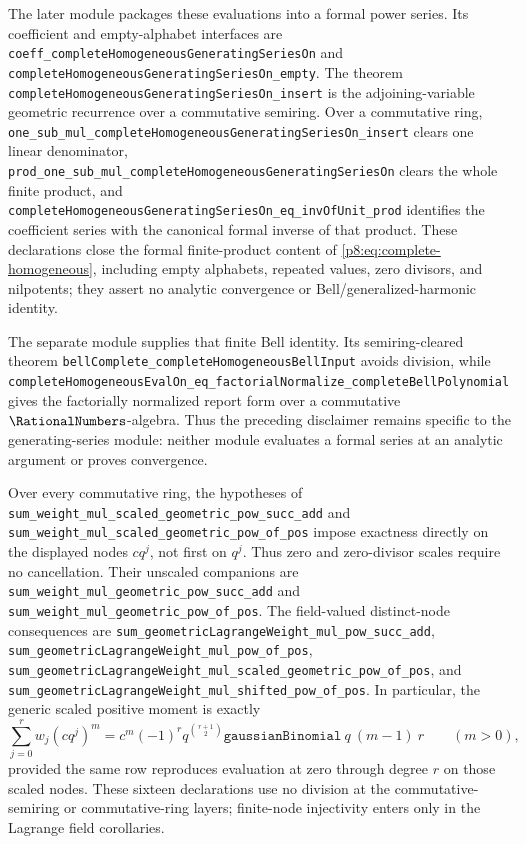 \documentclass[11pt]{article}
\numberwithin{equation}{section}
\theoremstyle{definition}
\theoremstyle{remark}
\begin{document}
The later module  packages these
evaluations into a formal power series.  Its coefficient and empty-alphabet
interfaces are
\nolinkurl{coeff_completeHomogeneousGeneratingSeriesOn} and
\nolinkurl{completeHomogeneousGeneratingSeriesOn_empty}.  The theorem
\nolinkurl{completeHomogeneousGeneratingSeriesOn_insert} is the
adjoining-variable geometric recurrence over a commutative semiring.  Over a
commutative ring,
\nolinkurl{one_sub_mul_completeHomogeneousGeneratingSeriesOn_insert} clears
one linear denominator,
\nolinkurl{prod_one_sub_mul_completeHomogeneousGeneratingSeriesOn} clears the
whole finite product, and
\nolinkurl{completeHomogeneousGeneratingSeriesOn_eq_invOfUnit_prod}
identifies the coefficient series with the canonical formal inverse of that
product.  These declarations close the formal finite-product content of
\eqref{p8:eq:complete-homogeneous}, including empty alphabets, repeated
values, zero divisors, and nilpotents; they assert no analytic convergence or
Bell/generalized-harmonic identity.

The separate module  supplies that finite
Bell identity.  Its semiring-cleared theorem
\nolinkurl{bellComplete_completeHomogeneousBellInput} avoids division, while
\nolinkurl{completeHomogeneousEvalOn_eq_factorialNormalize_completeBellPolynomial}
gives the factorially normalized report form over a commutative
$\RationalNumbers$-algebra.  Thus the preceding disclaimer remains specific to the
generating-series module: neither module evaluates a formal series at an
analytic argument or proves convergence.

Over every commutative ring, the hypotheses of
\nolinkurl{sum_weight_mul_scaled_geometric_pow_succ_add} and
\nolinkurl{sum_weight_mul_scaled_geometric_pow_of_pos} impose exactness
directly on the displayed nodes \(c q^j\), not first on \(q^j\).  Thus zero
and zero-divisor scales require no cancellation.  Their unscaled companions
are \nolinkurl{sum_weight_mul_geometric_pow_succ_add} and
\nolinkurl{sum_weight_mul_geometric_pow_of_pos}.  The field-valued
distinct-node consequences are
\nolinkurl{sum_geometricLagrangeWeight_mul_pow_succ_add},
\nolinkurl{sum_geometricLagrangeWeight_mul_pow_of_pos},
\nolinkurl{sum_geometricLagrangeWeight_mul_scaled_geometric_pow_of_pos}, and
\nolinkurl{sum_geometricLagrangeWeight_mul_shifted_pow_of_pos}.  In particular,
the generic scaled positive moment is exactly
\[
 \sum_{j=0}^{r}w_j(cq^j)^m
 =c^m(-1)^r q^{\binom{r+1}{2}}
   \texttt{gaussianBinomial}\ q\ (m-1)\ r
 \qquad(m>0),
\]
provided the same row reproduces evaluation at zero through degree \(r\) on
those scaled nodes.  These sixteen declarations use no division at the
commutative-semiring or commutative-ring layers; finite-node injectivity enters
only in the Lagrange field corollaries.
\end{document}
